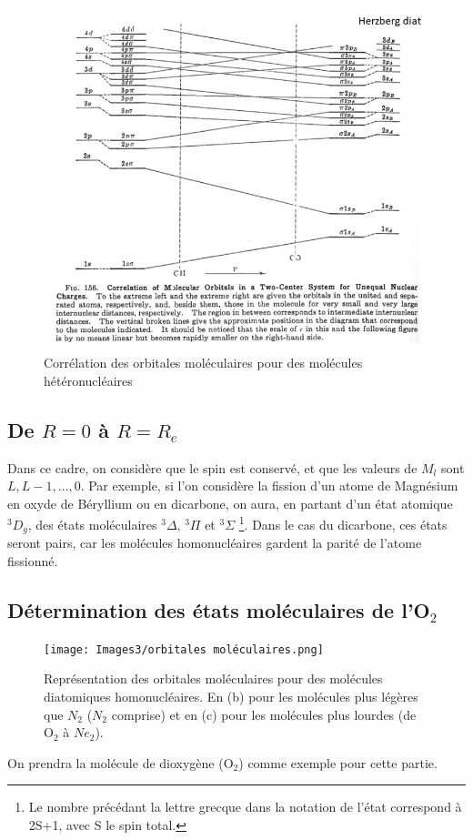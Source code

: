 \begin{figure}[htpb]
    \centering
    \includegraphics[scale=0.45]{Images3/Corrélation hétéronucléaire.png}
    \caption{Corrélation des orbitales moléculaires pour des molécules hétéronucléaires}
\end{figure}
\clearpage


\subsection{De $R=0$ à $R=R_e$}


Dans ce cadre, on considère que le spin est conservé, et que les valeurs de $M_l$ sont $L, L-1, \dots, 0$. Par exemple, si l'on considère la fission d'un atome de Magnésium en oxyde de Béryllium ou en dicarbone, on aura, en partant d'un état atomique $^3D_g$, des états moléculaires $^3\Delta$, $^3\Pi$ et $^3\Sigma$ \footnote{Le nombre précédant la lettre grecque dans la notation de l'état correspond à 2S+1, avec S le spin total.}. Dans le cas du dicarbone, ces états seront pairs, car les molécules homonucléaires gardent la parité de l'atome fissionné.


\subsection{Détermination des états moléculaires de l'O$_2$}


\begin{figure}[htpb]
\centering
\texttt{[image: Images3/orbitales moléculaires.png]}
\caption{Représentation des orbitales moléculaires pour des molécules diatomiques homonucléaires. En (b) pour les molécules plus légères que $N_2$ ($N_2$ comprise) et en (c) pour les molécules plus lourdes (de O$_2$ à $Ne_2$).}
\label{fig:orbitales}
\end{figure}
On prendra la molécule de dioxygène (O$_2$) comme exemple pour cette partie.


